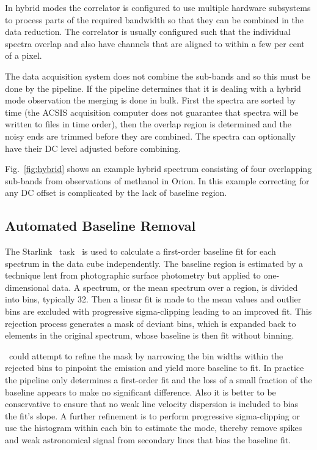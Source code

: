\documentclass[final,authoryear,5p,times,twocolumn]{elsarticle}
\begin{document}
In hybrid modes the correlator is configured to use multiple
hardware subsystems to process parts of the required bandwidth so
that they can be combined in the data reduction. The correlator is
usually configured such that the individual spectra overlap and also
have channels that are aligned to within a few per cent of a pixel.

The data acquisition system does not combine the sub-bands and so this
must be done by the pipeline. If the pipeline determines that it is
dealing with a hybrid mode observation the merging is done in
bulk. First the spectra are sorted by time (the ACSIS acquisition
computer does not guarantee that spectra will be written to files in
time order), then the overlap region is determined and the noisy ends
are trimmed before they are combined. The spectra can optionally have
their DC level adjusted before combining.

Fig.\ \ref{fig:hybrid} shows an example hybrid spectrum consisting of
four overlapping sub-bands from observations of methanol in Orion. In this
example correcting for any DC offset is complicated by the lack of
baseline region.

\subsection{Automated Baseline Removal}
\label{sec:mfittrend}

The Starlink \KAPPA\ task \mfittrend\ is used to calculate a
first-order baseline fit for each spectrum in the data cube
independently. The baseline region is estimated by a technique lent
from photographic surface photometry but applied to one-dimensional
data.  A spectrum, or the mean spectrum over a region, is divided into
bins, typically 32.  Then a linear fit is made to the mean values and
outlier bins are excluded with progressive sigma-clipping leading to
an improved fit.  This rejection process generates a mask of deviant
bins, which is expanded back to elements in the original spectrum,
whose baseline is then fit without binning.

\mfittrend\ could attempt to refine the mask by narrowing the bin
widths within the rejected bins to pinpoint the emission and yield
more baseline to fit.  In practice the pipeline only determines a
first-order fit and the loss of a small fraction of the baseline
appears to make no significant difference.  Also it is better to be
conservative to ensure that no weak line velocity dispersion is
included to bias the fit's slope.  A further refinement is to perform
progressive sigma-clipping or use the histogram within each bin to
estimate the mode, thereby remove spikes and weak astronomical signal
from secondary lines that bias the baseline fit.
\end{document}
